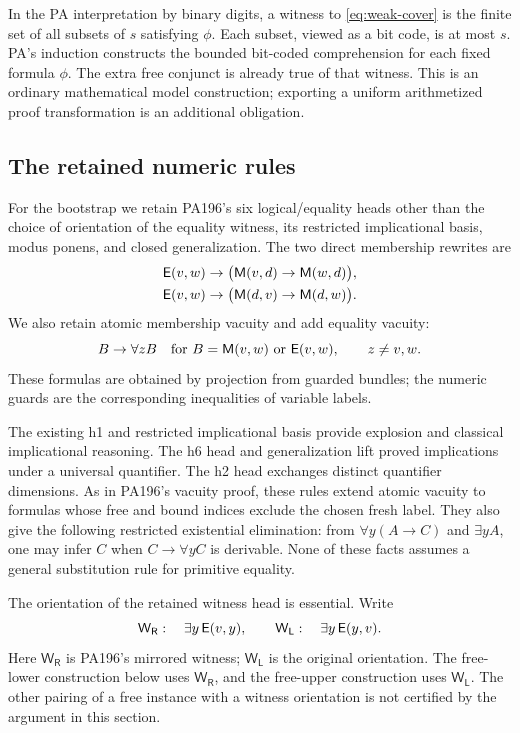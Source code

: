 In the PA interpretation by binary digits, a witness to
\eqref{eq:weak-cover} is the finite set of all subsets of $s$ satisfying
$\phi$. Each subset, viewed as a bit code, is at most $s$. PA's induction
constructs the bounded bit-coded comprehension for each fixed formula
$\phi$. The extra free conjunct is already true of that witness. This is
an ordinary mathematical model construction; exporting a uniform
arithmetized proof transformation is an additional obligation.

\subsection{The retained numeric rules}

For the bootstrap we retain PA196's six logical/equality heads other than
the choice of orientation of the equality witness, its restricted
implicational basis, modus ponens, and closed generalization. The two
direct membership rewrites are
\begin{align}
 \mathsf E(v,w)&\to\bigl(\mathsf M(v,d)\to\mathsf M(w,d)\bigr),\label{eq:direct-first}\\
 \mathsf E(v,w)&\to\bigl(\mathsf M(d,v)\to\mathsf M(d,w)\bigr).\label{eq:direct-second}
\end{align}
We also retain atomic membership vacuity and add equality vacuity:
\[
 B\to\forall z B
 \quad\text{for }B=\mathsf M(v,w)\text{ or }\mathsf E(v,w),
 \qquad z\ne v,w.
\]
These formulas are obtained by projection from guarded bundles; the
numeric guards are the corresponding inequalities of variable labels.

The existing h1 and restricted implicational basis provide explosion and
classical implicational reasoning. The h6 head and generalization lift
proved implications under a universal quantifier. The h2 head exchanges
distinct quantifier dimensions. As in PA196's vacuity proof, these rules
extend atomic vacuity to formulas whose free and bound indices exclude
the chosen fresh label. They also give the following restricted
existential elimination: from $\forall y(A\to C)$ and $\exists y A$,
one may infer $C$ when $C\to\forall y C$ is derivable. None of these
facts assumes a general substitution rule for primitive equality.

The orientation of the retained witness head is essential. Write
\[
 \mathsf{W_R}:\quad\exists y\,\mathsf E(v,y),
 \qquad
 \mathsf{W_L}:\quad\exists y\,\mathsf E(y,v).
\]
Here $\mathsf{W_R}$ is PA196's mirrored witness; $\mathsf{W_L}$ is the
original orientation. The free-lower construction below uses
$\mathsf{W_R}$, and the free-upper construction uses $\mathsf{W_L}$.
The other pairing of a free instance with a witness orientation is not
certified by the argument in this section.

